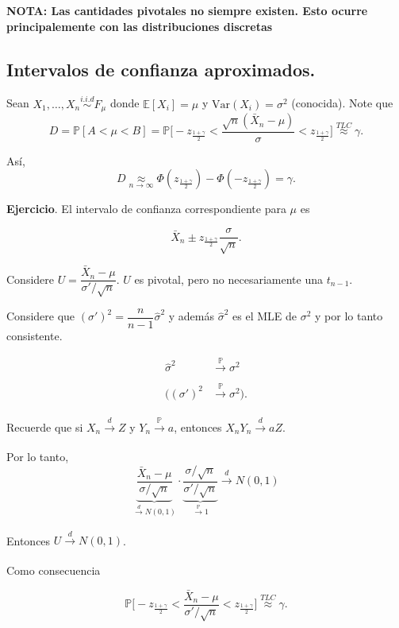 \documentclass[
  12pt,
]{book}
\begin{document}
\textbf{NOTA: Las cantidades pivotales no siempre existen. Esto ocurre principalemente
con las distribuciones discretas}

\hypertarget{intervalos-de-confianza-aproximados.}{%
\subsection{Intervalos de confianza aproximados.}\label{intervalos-de-confianza-aproximados.}}

Sean \(X_1,\dots, X_n \stackrel{i.i.d}{\sim}F_{\mu}\) donde \(\mathbb{E}[X_i] = \mu\) y
\(\text{Var}(X_i) = \sigma^2\) (conocida). Note que \[D = \mathbb P[A<\mu<B] = \mathbb P
\bigg[-z_{\frac{1+\gamma}2}<\dfrac{\sqrt n(\bar X_n-\mu)}{\sigma} <z_{\frac{1+\gamma}2}\bigg]
\stackrel{TLC}{\approx} \gamma.\]

Así, \[D \underset{n\to\infty}{\approx}
\Phi\left(z_{\frac{1+\gamma}2}\right)-\Phi\left(-z_{\frac{1+\gamma}2}\right) = \gamma.\]

\textbf{Ejercicio}. El intervalo de confianza correspondiente para \(\mu\) es

\[
\bar
X_n \pm z_{\frac{1+\gamma}2}\dfrac{\sigma}{\sqrt n}.
\]

Considere \(U = \dfrac{\bar X_n - \mu}{\sigma'/\sqrt n}\). \(U\) es pivotal, pero no
necesariamente una \(t_{n-1}\).

Considere que \((\sigma')^2 = \dfrac{n}{n-1}\hat \sigma^2\) y además \(\hat\sigma^2\) es el MLE de
\(\sigma^2\) y por lo tanto consistente.

\begin{align*}
\hat{\sigma}^2 &\xrightarrow[]{\mathbb{P}}\sigma^2 \\
((\sigma')^2 &\xrightarrow[]{\mathbb{P}}\sigma^2).
\end{align*}

Recuerde que si \(X_n\xrightarrow[]{d}Z\) y \(Y_n\xrightarrow[]{\mathbb{P}}a\), entonces
\(X_nY_n \xrightarrow[]{d}aZ\).

Por lo tanto,
\[
\underbrace{\dfrac{\bar X_n-\mu}{\sigma/\sqrt n}}_{\xrightarrow[]{d}
N(0,1)} \cdot \underbrace{\dfrac{\sigma/\sqrt n}{\sigma'/\sqrt n}}_{\xrightarrow[]{\mathbb
P}1} \xrightarrow[]{d}N(0,1)\]

Entonces \(U\xrightarrow[]{d}N(0,1)\).

Como consecuencia

\[
\mathbb P \bigg[-z_{\frac{1+\gamma}2}<\dfrac{\bar X_n-\mu}{\sigma'/\sqrt n}
<z_{\frac{1+\gamma}2}\bigg] \stackrel{TLC}{\approx} \gamma.
\]
\end{document}
